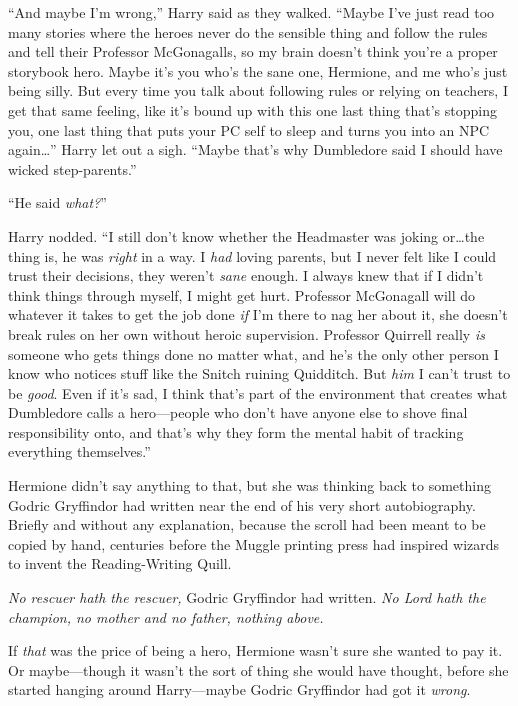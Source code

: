 “And maybe I’m wrong,” Harry said as they walked. “Maybe I’ve just read too many stories where the heroes never do the sensible thing and follow the rules and tell their Professor McGonagalls, so my brain doesn’t think you’re a proper storybook hero. Maybe it’s you who’s the sane one, Hermione, and me who’s just being silly. But every time you talk about following rules or relying on teachers, I get that same feeling, like it’s bound up with this one last thing that’s stopping you, one last thing that puts your PC self to sleep and turns you into an NPC again…” Harry let out a sigh. “Maybe that’s why Dumbledore said I should have wicked step-parents.”

“He said \emph{what?}”

Harry nodded. “I still don’t know whether the Headmaster was joking or…the thing is, he was \emph{right} in a way. I \emph{had} loving parents, but I never felt like I could trust their decisions, they weren’t \emph{sane} enough. I always knew that if I didn’t think things through myself, I might get hurt. Professor McGonagall will do whatever it takes to get the job done \emph{if} I’m there to nag her about it, she doesn’t break rules on her own without heroic supervision. Professor Quirrell really \emph{is} someone who gets things done no matter what, and he’s the only other person I know who notices stuff like the Snitch ruining Quidditch. But \emph{him} I can’t trust to be \emph{good}. Even if it’s sad, I think that’s part of the environment that creates what Dumbledore calls a hero—people who don’t have anyone else to shove final responsibility onto, and that’s why they form the mental habit of tracking everything themselves.”

Hermione didn’t say anything to that, but she was thinking back to something Godric Gryffindor had written near the end of his very short autobiography. Briefly and without any explanation, because the scroll had been meant to be copied by hand, centuries before the Muggle printing press had inspired wizards to invent the Reading-Writing Quill.

\emph{No rescuer hath the rescuer,} Godric Gryffindor had written. \emph{No Lord hath the champion, no mother and no father, nothing above.}

If \emph{that} was the price of being a hero, Hermione wasn’t sure she wanted to pay it. Or maybe—though it wasn’t the sort of thing she would have thought, before she started hanging around Harry—maybe Godric Gryffindor had got it \emph{wrong}.


